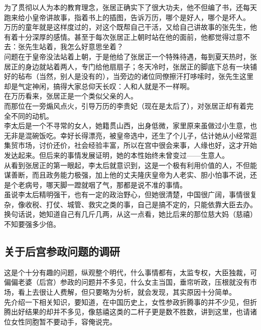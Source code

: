 \begin{multicols}{\theparacolNo}
为了贯彻以人为本的教育理念，张居正确实下了很大功夫，他不但编了书，还每天跑来给小皇帝讲故事，指着书上的插图，告诉万历，哪个是好人，哪个是坏人。\\

万历的童年就是这样度过的，对这个既帮自己干活，又给自己讲故事的张先生，他有着十分深厚的感情。甚至于每次张居正上朝时站在他的面前，他都觉得过意不去：张先生站着，我怎么好意思坐着？\\

问题在于皇帝没法站着上朝，于是他给了张居正一个特殊待遇，每到夏天热时，张居正的身边就站着两人，专门给他扇扇子；冬天冷时，张居正的脚底下总有一块铺好的毡布（当然，别人是没有的），当旁边的诸位同僚擦汗打哆嗦时，张先生这里却是气定神闲，搞得大家总仰天长叹：人和人就是不一样啊。\\

在万历看来，张居正是一个类似父亲的人。\\

而那位在一旁煽风点火，引导万历的李贵妃（现在是太后了），对张居正却有着完全不同的动机。\\

李太后是一个不寻常的女人，她籍贯山西，出身低微，家里原来虽做过小生意，也无非是混碗饭吃。幸好长得漂亮，被皇帝选中，还生了个儿子，估计她从小经常逛集贸市场，讨价还价，社会经验丰富，所以在宫中很会来事，人缘也好，这才开始发达起来。但后来的事情发展证明，她的本性始终未曾变过——生意人。\\

从看到张居正的第一眼起，李太后就意识到，这是一个极有利用价值的人，不但能谋善断，而且政务能力极强，加上他的丈夫隆庆皇帝为人老实、胆小怕事不说，还是个老病号，哪天脚一蹬就咽了气，那都是说不准的事情。\\

虽说李太后精明强干，也有一定的政治野心，但她很清楚，中国很广阔，事情很复杂，像收税、打仗、城管、救灾之类的事，自己是搞不定的，只能依靠大臣去办。换句话说，她知道自己有几斤几两，从这一点看，她比后来的那位慈大妈（慈禧）不知要强多少倍。\\

\subsection{关于后宫参政问题的调研}
这是个十分有趣的问题，纵观整个明代，什么事情都有，太监专权，大臣独裁，可偏偏老婆（后宫）参政的问题并不多见，什么女主当国，垂帘听政，压根就没有市场，看上去很让人费解，但只要略为分析，就会发现，其实原因十分简单。\\

先介绍一下相关知识，要知道，在中国历史上，女性参政折腾事的并不少见，但折腾出好结果的却并不多见，像慈禧这类的二杆子更是数不胜数，讲到这里，也请诸位女性同胞暂不要动手，容俺说完。\\


\end{multicols}
